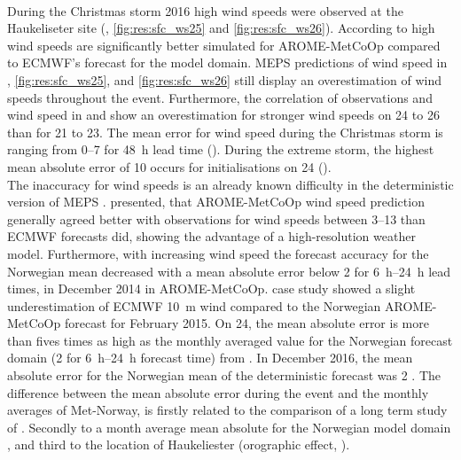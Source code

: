 \noindent
\\
During the Christmas storm 2016 high wind speeds were observed at the Haukeliseter site (, \ref{fig:res:sfc_ws25}  and \ref{fig:res:sfc_ws26}).
According to \citet{muller_arome-metcoop:_2017} high wind speeds are significantly better simulated for AROME-MetCoOp compared to ECMWF's forecast for the model domain. MEPS predictions of wind speed in , \ref{fig:res:sfc_ws25}, and \ref{fig:res:sfc_ws26} still display an overestimation of wind speeds throughout the event. Furthermore, the correlation of observations and wind speed in  and  show an overestimation for stronger wind speeds on \num{24} to \SI{26}{\dec} than for \num{21} to \SI{23}{\dec}. 
The mean error for wind speed during the Christmas storm is ranging from \SIrange{0}{7}{\mPs} for \SI{48}{\hour} lead time ().
During the extreme storm, the highest mean absolute error of \SI{10}{\mPs} occurs for initialisations on \SI{24}{\dec} ().
\\
The inaccuracy for wind speeds is an already known difficulty in the deterministic version of MEPS \citep{muller_arome-metcoop:_2017}. \citet{muller_arome-metcoop:_2017} presented, that AROME-MetCoOp wind speed prediction generally agreed better with observations for wind speeds between \SIrange{3}{13}{\mPs} than ECMWF forecasts did, showing the advantage of a high-resolution weather model. Furthermore, with increasing wind speed the forecast accuracy for the Norwegian mean decreased with a mean absolute error below \SI{2}{\mPs} for \SIrange{6}{24}{\hour} lead times, in December 2014 in AROME-MetCoOp. \citet{muller_arome-metcoop:_2017} case study showed a slight underestimation of ECMWF \SI{10}{\metre} wind compared to the Norwegian AROME-MetCoOp forecast for February 2015. %
On \SI{24}{\dec}, the mean absolute error is more than fives times as high as the monthly averaged value for the Norwegian forecast domain (\SI{2}{\mPs} for \SIrange{6}{24}{\hour} forecast time) from \citet{muller_arome-metcoop:_2017}. 
In December 2016, the mean absolute error for the Norwegian mean of the deterministic forecast was \SI{2}{\mPs} \citep{homleid_verification_2016}.
The difference between the mean absolute error during the event and the monthly averages of Met-Norway, is firstly related to the comparison of a long term study of \citet{muller_arome-metcoop:_2017}. Secondly to a month average mean absolute for the Norwegian model domain \citep{muller_arome-metcoop:_2017,homleid_verification_2016}, and third to the location of Haukeliester (orographic effect, ). 
